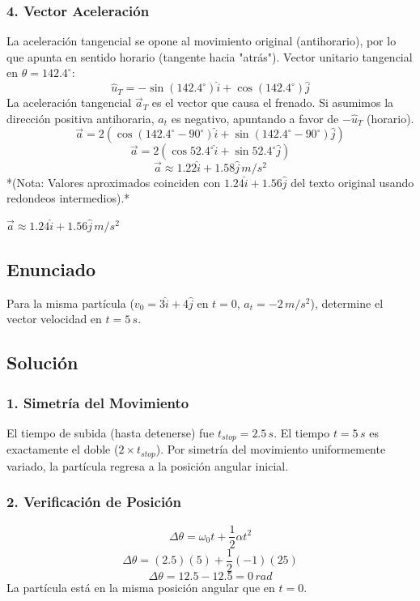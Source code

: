 \documentclass[12pt, a4paper]{article}
\begin{document}
\subsubsection*{4. Vector Aceleración}
La aceleración tangencial se opone al movimiento original (antihorario), por lo que apunta en sentido horario (tangente hacia "atrás").
Vector unitario tangencial en $\theta = 142.4^\circ$:
$$ \hat{u}_T = -\sin(142.4^\circ)\hat{i} + \cos(142.4^\circ)\hat{j} $$
La aceleración tangencial $\vec{a}_T$ es el vector que causa el frenado. Si asumimos la dirección positiva antihoraria, $a_t$ es negativo, apuntando a favor de $-\hat{u}_T$ (horario).
$$ \vec{a} = 2 (\cos(142.4^\circ - 90^\circ)\hat{i} + \sin(142.4^\circ - 90^\circ)\hat{j}) $$
$$ \vec{a} = 2 (\cos 52.4^\circ \hat{i} + \sin 52.4^\circ \hat{j}) $$
$$ \vec{a} \approx 1.22\hat{i} + 1.58\hat{j} \, \si{m/s^2} $$
*(Nota: Valores aproximados coinciden con $1.24\hat{i} + 1.56\hat{j}$ del texto original usando redondeos intermedios).*

\begin{tcolorbox}[colback=blue!5!white, colframe=blue!75!black, title=Respuesta Final]
\centering $\vec{a} \approx 1.24\hat{i} + 1.56\hat{j} \, \si{m/s^2}$
\end{tcolorbox}

\newpage

\subsection*{Enunciado}
Para la misma partícula ($v_0 = 3\hat{i} + 4\hat{j}$ en $t=0$, $a_t = -2\,\si{m/s^2}$), determine el vector velocidad en $t=5\,\si{s}$.

\subsection*{Solución}

\subsubsection*{1. Simetría del Movimiento}
El tiempo de subida (hasta detenerse) fue $t_{stop} = 2.5\,\si{s}$.
El tiempo $t=5\,\si{s}$ es exactamente el doble ($2 \times t_{stop}$).
Por simetría del movimiento uniformemente variado, la partícula regresa a la posición angular inicial.

\subsubsection*{2. Verificación de Posición}
$$ \Delta \theta = \omega_0 t + \frac{1}{2}\alpha t^2 $$
$$ \Delta \theta = (2.5)(5) + \frac{1}{2}(-1)(25) $$
$$ \Delta \theta = 12.5 - 12.5 = 0 \, \si{rad} $$
La partícula está en la misma posición angular que en $t=0$.
\end{document}
